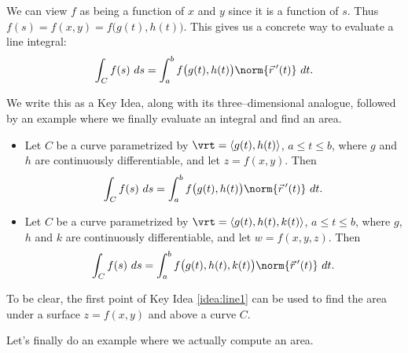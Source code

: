 We can view $f$ as being a function of $x$ and $y$ since it is a function of $s$. Thus $f(s) =f(x,y) =f\big(g(t),h(t)\big)$. This gives us a concrete way to evaluate a line integral:
$$\int_C f(s)\ ds = \int_a^bf\big(g(t),h(t)\big)\norm{\vec r\,'(t)}\ dt.$$

We write this as a Key Idea, along with its three--dimensional analogue, followed by an example where we finally evaluate an integral and find an area.

{\begin{itemize}
	\item Let $C$ be a curve parametrized by $\vrt =\langle g(t), h(t)\rangle$, $a\leq t\leq b$, where $g$ and $h$ are continuously differentiable, and let $z=f(x,y)$. Then
	$$\int_Cf(s)\ ds = \int_a^bf\big(g(t),h(t)\big)\norm{\vec r\,'(t)}\ dt.$$
	\item Let $C$ be a curve parametrized by $\vrt =\langle g(t), h(t),k(t)\rangle$, $a\leq t\leq b$, where $g$, $h$ and $k$ are continuously differentiable, and let $w=f(x,y,z)$. Then
	$$\int_Cf(s)\ ds = \int_a^bf\big(g(t),h(t),k(t)\big)\norm{\vec r\,'(t)}\ dt.$$
\end{itemize}
}

To be clear, the first point of Key Idea \ref{idea:line1} can be used to find the area under a surface $z=f(x,y)$ and above a curve $C$.

Let's finally do an example where we actually compute an area.\\

